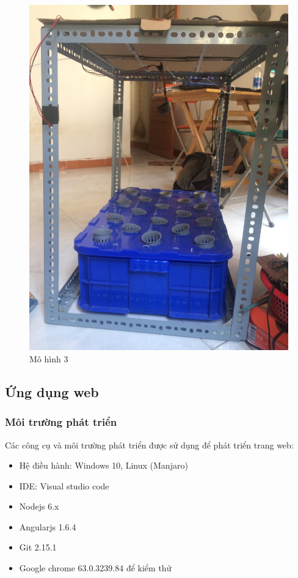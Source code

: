 \documentclass[a4paper,12pt,oneside]{article}
\begin{document}
\begin{enumerate}
			\begin{figure}[H]
			\centering
			\begin{center}
			\includegraphics[scale=.15]{hinh/mohinh_3.jpg}
			\end{center}
			\caption{Mô hình 3}
			\end{figure}
	\end{enumerate}

\subsection{Ứng dụng web}
\subsubsection{Môi trường phát triển}
Các công cụ và môi trường phát triển được sử dụng để phát triển trang web:
\begin{itemize}
\item Hệ điều hành: Windows 10, Linux (Manjaro)
\item IDE: Visual studio code
\item Nodejs 6.x
\item Angularjs 1.6.4
\item Git 2.15.1
\item Google chrome 63.0.3239.84 để kiểm thử 
\end{itemize}
\end{document}
